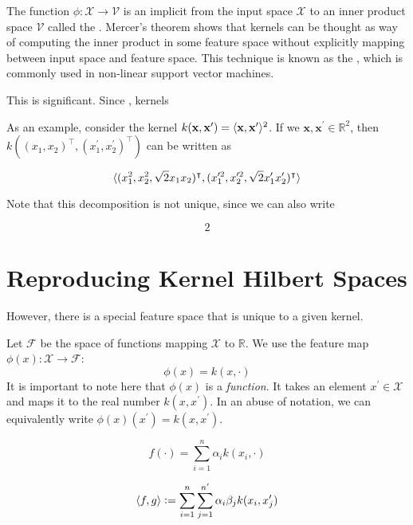 The function $\phi : \mathcal{X} \to \mathcal{V}$ is an implicit  from the input space $\mathcal{X}$ to an inner product space $\mathcal{V}$ called the . Mercer's theorem shows that kernels can be thought as way of computing the inner product in some feature space without explicitly mapping between input space and feature space. This technique is known as the , which is commonly used in non-linear support vector machines.

This is significant. Since , kernels 

As an example, consider the kernel $k(\mathbf{x}, \mathbf{x}^\prime) = \langle\mathbf{x}, \mathbf{x}^\prime\rangle^2$. If we $\mathbf{x}, \mathbf{x}^\prime \in \mathbb{R}^2$, then $k((x_1, x_2)^\intercal, (x_1^\prime, x_2^\prime)^\intercal)$ can be written as

\begin{equation}
\langle(x_1^2, x_2^2, \sqrt{2} x_1 x_2)^\intercal, (x_1^{\prime 2}, x_2^{\prime 2}, \sqrt{2} x_1^\prime x_2^\prime)^\intercal\rangle
\end{equation}

Note that this decomposition is not unique, since we can also write

\begin{equation}
2
\end{equation}

\section{Reproducing Kernel Hilbert Spaces}
However, there is a special feature space that is unique to a given kernel. 

Let $\mathcal{F}$ be the space of functions mapping $\mathcal{X}$ to $\mathbb{R}$. We use the feature map $\phi(x) : \mathcal{X} \to \mathcal{F}$:
\begin{equation}
	\phi(x) = k(x, \cdot)
\end{equation}
It is important to note here that $\phi(x)$ is a \emph{function}. It takes an element $x^\prime \in \mathcal{X}$ and maps it to the real number $k(x, x^\prime)$. In an abuse of notation, we can equivalently write $\phi(x)(x^\prime) = k(x, x^\prime)$.

\begin{equation}
	f(\cdot) = \sum_{i=1}^n \alpha_i k(x_i, \cdot)
\end{equation}

\begin{equation}
	\langle f, g\rangle \vcentcolon= \sum_{i=1}^n \sum_{j=1}^{n^\prime} \alpha_i \beta_j k(x_i, x_j^\prime)
\end{equation}


